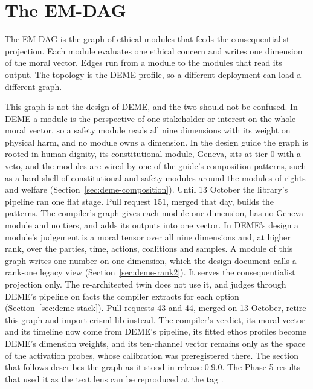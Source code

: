 \section{The EM-DAG}\label{sec:compiler-emdag}

The EM-DAG is the graph of ethical modules that feeds the consequentialist projection. Each module
evaluates one ethical concern and writes one dimension of the moral vector. Edges run from a module
to the modules that read its output. The topology is the DEME profile, so a different deployment
can load a different graph.

This graph is not the design of DEME, and the two should not be confused.
In DEME a module is the perspective of one stakeholder or interest on the whole moral vector, so a
safety module reads all nine dimensions with its weight on physical harm, and no module owns a
dimension.
In the design guide the graph is rooted in human dignity, its constitutional module, Geneva, sits at
tier 0 with a veto, and the modules are wired by one of the guide's composition patterns, such as a
hard shell of constitutional and safety modules around the modules of rights and welfare
(Section~\ref{sec:deme-composition}).
Until 13 October the library's pipeline ran one flat stage. Pull request 151, merged that day,
builds the patterns.
The compiler's graph gives each module one dimension, has no Geneva module and no tiers, and adds
its outputs into one vector.
In DEME's design a module's judgement is a moral tensor over all nine dimensions and, at higher
rank, over the parties, time, actions, coalitions and samples. A module of this graph writes one
number on one dimension, which the design document calls a rank-one legacy view
(Section~\ref{sec:deme-rank2}).
It serves the consequentialist projection only.
The re-architected twin does not use it, and judges through DEME's pipeline on facts the compiler
extracts for each option (Section~\ref{sec:deme-stack}).
Pull requests 43 and 44, merged on 13 October, retire this graph and import erisml-lib instead.
The compiler's verdict, its moral vector and its timeline now come from DEME's pipeline, its fitted
ethos profiles become DEME's dimension weights, and its ten-channel vector remains only as the
space of the activation probes, whose calibration was preregistered there.
The section that follows describes the graph as it stood in release 0.9.0.
The Phase-5 results that used it as the text lens can be reproduced at the tag
.

